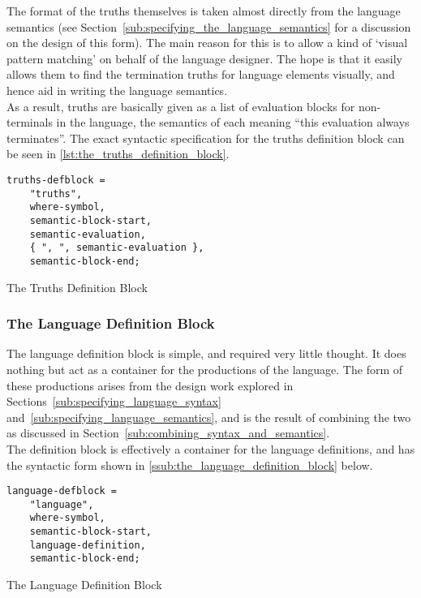 The format of the truths themselves is taken almost directly from the language semantics (see Section~\ref{sub:specifying_the_language_semantics} for a discussion on the design of this form).
The main reason for this is to allow a kind of `visual pattern matching' on behalf of the language designer. 
The hope is that it easily allows them to find the termination truths for language elements visually, and hence aid in writing the language semantics.\\

As a result, truths are basically given as a list of evaluation blocks for non-terminals in the language, the semantics of each meaning ``this evaluation always terminates''. 
The exact syntactic specification for the truths definition block can be seen in \autoref{lst:the_truths_definition_block}. 

\begin{listing}[!htb]
\begin{verbatim}
truths-defblock =
    "truths",
    where-symbol, 
    semantic-block-start,
    semantic-evaluation,
    { ", ", semantic-evaluation },
    semantic-block-end;
\end{verbatim}
\caption{The Truths Definition Block}
\label{lst:the_truths_definition_block}
\end{listing}


\subsubsection{The Language Definition Block} %
\label{ssub:the_language_definition_block}
The language definition block is simple, and required very little thought. 
It does nothing but act as a container for the productions of the language.
The form of these productions arises from the design work explored in Sections~\ref{sub:specifying_language_syntax} and~\ref{sub:specifying_language_semantics}, and is the result of combining the two as discussed in Section~\ref{sub:combining_syntax_and_semantics}.\\

The definition block is effectively a container for the language definitions, and has the syntactic form shown in \autoref{ssub:the_language_definition_block} below.

\begin{listing}[!htb]
\begin{verbatim}
language-defblock =
    "language",
    where-symbol,
    semantic-block-start,
    language-definition,
    semantic-block-end;
\end{verbatim}
\caption{The Language Definition Block}
\label{lst:the_language_definition_block}
\end{listing}

